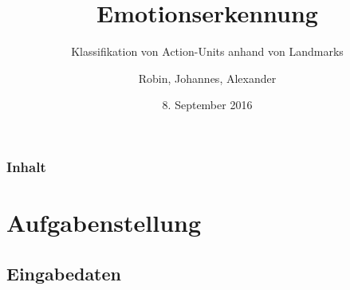 \documentclass{beamer}
\author{Robin, Johannes, Alexander}
\title{Emotionserkennung}
\subtitle{Klassifikation von Action-Units anhand von Landmarks}
\date{8. September 2016}
\begin{document}
%



\begin{frame}[plain]
  \maketitle
\end{frame}
\begin{frame}
  \frametitle{Inhalt}
  \tableofcontents
\end{frame}

\section{Aufgabenstellung}
\subsection{Eingabedaten}
\begin{frame}
  \begin{center}
  \end{center}
\end{frame}
\end{document}
